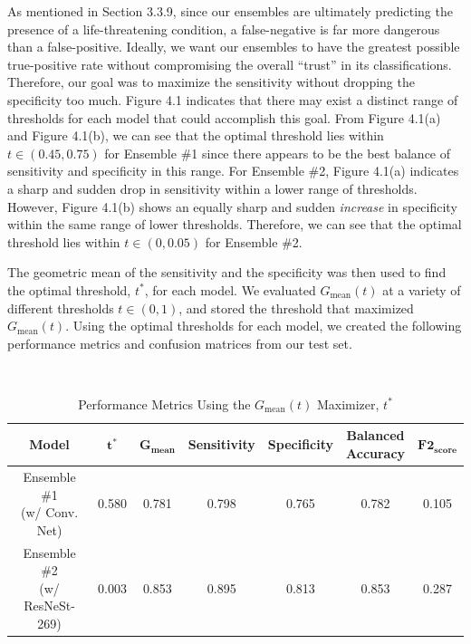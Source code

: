 \documentclass [MAS] {uclathes}
\begin{document}
As mentioned in Section 3.3.9, since our ensembles are ultimately predicting the presence of a life-threatening condition, a false-negative is far more dangerous than a false-positive. Ideally, we want our ensembles to have the greatest possible true-positive rate without compromising the overall ``trust'' in its classifications. Therefore, our goal was to maximize the sensitivity without dropping the specificity too much. Figure 4.1 indicates that there may exist a distinct range of thresholds for each model that could accomplish this goal. From Figure 4.1(a) and Figure 4.1(b), we can see that the optimal threshold lies within $t \in (0.45, 0.75)$ for Ensemble \#1 since there appears to be the best balance of sensitivity and specificity in this range. For Ensemble \#2, Figure 4.1(a) indicates a sharp and sudden drop in sensitivity within a lower range of thresholds. However, Figure 4.1(b) shows an equally sharp and sudden \textit{increase} in specificity within the same range of lower thresholds. Therefore, we can see that the optimal threshold lies within $t \in (0, 0.05)$ for Ensemble \#2.

The geometric mean of the sensitivity and the specificity was then used to find the optimal threshold, $t^*$, for each model. We evaluated $G_{\text{mean}}(t)$ at a variety of different thresholds $t \in (0, 1)$, and stored the threshold that maximized $G_{\text{mean}}(t)$. Using the optimal thresholds for each model, we created the following performance metrics and confusion matrices from our test set.

\

\begin{table}[h!]
\centering
\footnotesize 
\begin{tabular}{| c | c | c | c | c | c | c |} 
\hline
\textbf{Model} & $\mathbf{t^*}$ & $\mathbf{G_{\text{mean}}}$ & \textbf{Sensitivity} & \textbf{Specificity} & \makecell{\textbf{Balanced} \\ \textbf{Accuracy}} & $\mathbf{F2_{\text{score}}}$ \\ 
\hline
\hline
\makecell{Ensemble \#1 \\ (w/ Conv. Net)} & 0.580 & 0.781 & 0.798 & 0.765 & 0.782 & 0.105\\
\hline
\makecell{Ensemble \#2 \\ (w/ ResNeSt-269)} & 0.003 & 0.853 & 0.895 & 0.813 & 0.853 & 0.287\\
\hline  
\end{tabular}
\label{tab:mods_metrics}
\caption{Performance Metrics Using the $G_{\text{mean}}(t)$ Maximizer, $t^*$}
\end{table}
\end{document}
